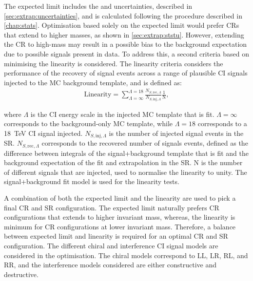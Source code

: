 The expected limit includes the \ISSU and \STATU uncertainties, described in \cref{sec:extrap:uncertainties}, and is calculated following the procedure described in \cref{chap:stats}. Optimisation based solely on the expected limit would prefer CRs that extend to higher masses, as shown in \cref{sec:extrap:ststu}. However, extending the CR to high-mass may result in a possible bias to the background expectation due to possible signals present in data. To address this, a second criteria based on minimising the linearity is considered. The linearity criteria considers the performance of the recovery of signal events across a range of plausible CI signals injected to the MC background template, and is defined as: 
\begin{equation}
    \label{eq:linearity}
    \begin{aligned}
        \mathrm{Linearity} = \sum^{\Lambda = 18}_{\Lambda = \infty} \frac{N_{S,\mathrm{rec},\Lambda}}{N_{S,\mathrm{inj},\Lambda}}  \frac{1}{\mathrm{N}},
    \end{aligned}
\end{equation}

where $\Lambda$ is the CI energy scale in the injected MC template that is fit. $\Lambda = \infty$ corresponds to the background-only MC template, while $\Lambda = 18$ corresponds to a \SI{18}{\tera\electronvolt} CI signal injected. $N_{S,\mathrm{inj},\Lambda}$ is the number of injected signal events in the SR. $N_{S,\mathrm{rec},\Lambda}$ corresponds to the recovered number of signals events, defined as the difference between integrals of the signal+background template that is fit and the background expectation of the fit and extrapolation in the SR. N is the number of different signals that are injected, used to normalise the linearity to unity. The signal+background fit model is used for the linearity tests. 

A combination of both the expected limit and the linearity are used to pick a final CR and SR configuration. The expected limit naturally prefers CR configurations that extends to higher invariant mass, whereas, the linearity is minimum for CR configurations at lower invariant mass. Therefore, a balance between expected limit and linearity is required for an optimal CR and SR configuration. The different chiral and interference CI signal models are considered in the optimisation. The chiral models correspond to LL, LR, RL, and RR, and the interference models considered are either constructive and destructive. 

